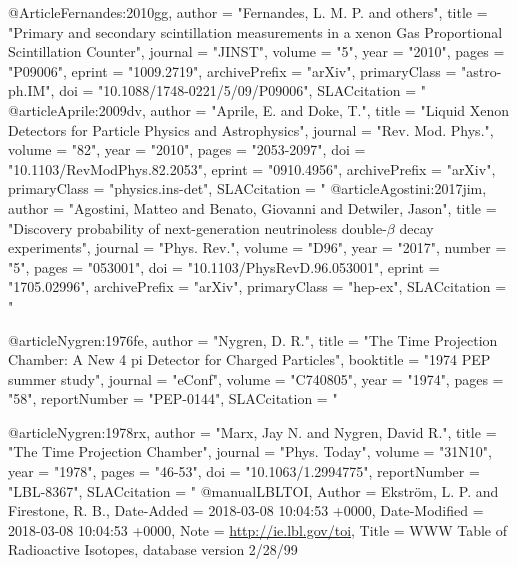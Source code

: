 @Article{Fernandes:2010gg,
     author    = "Fernandes, L. M. P. and others",
     title     = "{Primary and secondary scintillation measurements in a
                  xenon Gas Proportional Scintillation Counter}",
     journal   = "JINST",
     volume    = "5",
     year      = "2010",
     pages     = "P09006",
     eprint    = "1009.2719",
     archivePrefix = "arXiv",
     primaryClass  =  "astro-ph.IM",
     doi       = "10.1088/1748-0221/5/09/P09006",
     SLACcitation  = "%
}
@article{Aprile:2009dv,
      author         = "Aprile, E. and Doke, T.",
      title          = "{Liquid Xenon Detectors for Particle Physics and
                        Astrophysics}",
      journal        = "Rev. Mod. Phys.",
      volume         = "82",
      year           = "2010",
      pages          = "2053-2097",
      doi            = "10.1103/RevModPhys.82.2053",
      eprint         = "0910.4956",
      archivePrefix  = "arXiv",
      primaryClass   = "physics.ins-det",
      SLACcitation   = "%
}
@article{Agostini:2017jim,
      author         = "Agostini, Matteo and Benato, Giovanni and Detwiler,
                        Jason",
      title          = "{Discovery probability of next-generation neutrinoless
                        double-$\beta$ decay experiments}",
      journal        = "Phys. Rev.",
      volume         = "D96",
      year           = "2017",
      number         = "5",
      pages          = "053001",
      doi            = "10.1103/PhysRevD.96.053001",
      eprint         = "1705.02996",
      archivePrefix  = "arXiv",
      primaryClass   = "hep-ex",
      SLACcitation   = "%
}

@article{Nygren:1976fe,
      author         = "Nygren, D. R.",
      title          = "{The Time Projection Chamber: A New 4 pi Detector for
                        Charged Particles}",
      booktitle      = "{1974 PEP summer study}",
      journal        = "eConf",
      volume         = "C740805",
      year           = "1974",
      pages          = "58",
      reportNumber   = "PEP-0144",
      SLACcitation   = "%
}

@article{Nygren:1978rx,
      author         = "Marx, Jay N. and Nygren, David R.",
      title          = "{The Time Projection Chamber}",
      journal        = "Phys. Today",
      volume         = "31N10",
      year           = "1978",
      pages          = "46-53",
      doi            = "10.1063/1.2994775",
      reportNumber   = "LBL-8367",
      SLACcitation   = "%
}
@manual{LBLTOI,
	Author = {Ekstr{\"o}m, L. P. and Firestone, R. B.},
	Date-Added = {2018-03-08 10:04:53 +0000},
	Date-Modified = {2018-03-08 10:04:53 +0000},
	Note = {\href{http://ie.lbl.gov/toi}{http://ie.lbl.gov/toi}},
	Title = {{WWW Table of Radioactive Isotopes, database version 2/28/99}}}

